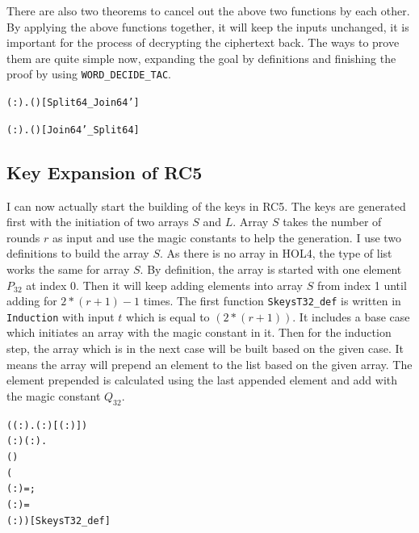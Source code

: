 \documentclass{article}
\begin{document}
There are also two theorems to cancel out the above two functions by each other. By applying the above functions
together, it will keep the inputs unchanged, it is important for the process of decrypting the ciphertext back.
The ways to prove them are quite simple now, expanding the goal by definitions and finishing the proof by using
\verb|WORD_DECIDE_TAC|.

\begin{alltt}
\HOLTokenTurnstile{} \HOLSymConst{\HOLTokenForall{}}( :).  ( ) \HOLSymConst{=} \hfill{[Split64_Join64']}
\end{alltt}

\begin{alltt}
\HOLTokenTurnstile{} \HOLSymConst{\HOLTokenForall{}}( :).  ( ) \HOLSymConst{=} \hfill{[Join64'_Split64]}
\end{alltt}

\subsection{Key Expansion of RC5 }
I can now actually start the building of the keys in RC5. The keys are generated first with the initiation of two arrays
$S$ and $L$. Array $S$ takes the number of rounds $r$ as input and use the magic constants to help the generation. I use two
definitions to build the array $S$. As there is no array in HOL4, the type of list works the same for array $S$. By definition, the array
is started with one element $P_{32}$ at index 0. Then it will keep adding elements into array $S$ from index 1 until adding for
$2*(r+1)-1$ times. The first function \verb|SkeysT32_def| is written in \verb|Induction| with input $t$ which is equal to $(2*(r+1))$.
It includes a base case which initiates
an array with the magic constant in it. Then for the induction step, the array which is in the next case will be built based on the
given case. It means the array will prepend an element to the list based on the given array. The element prepended is calculated using
the last appended element and add with the magic constant $Q_{32}$.

\begin{alltt}
\HOLTokenTurnstile{} (\HOLSymConst{\HOLTokenForall{}}( :).   ( :) \HOLSymConst{=} [( :)]) \HOLSymConst{\HOLTokenConj{}}
   \HOLSymConst{\HOLTokenForall{}}( :) ( :).
       ( ) \HOLSymConst{=}
     (
        ( : ) =   ;
        ( :) =  
         \HOLSymConst{\ensuremath{+}} ( :)\HOLSymConst{::})\hfill{[SkeysT32_def]}
\end{alltt}
\end{document}
